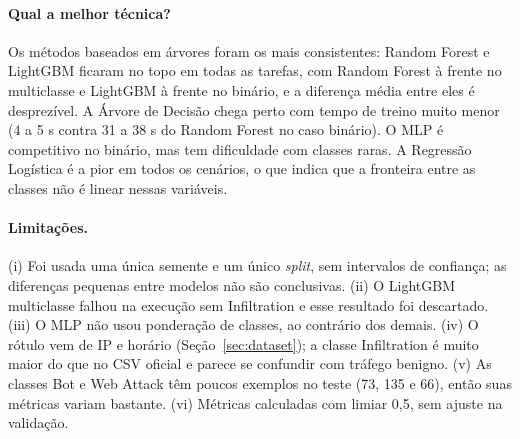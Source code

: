 \paragraph{Qual a melhor técnica?}
Os métodos baseados em árvores foram os mais consistentes: Random Forest e LightGBM ficaram no topo em todas as tarefas, com Random Forest à frente no multiclasse e LightGBM à frente no binário, e a diferença média entre eles é desprezível. A Árvore de Decisão chega perto com tempo de treino muito menor (4 a 5 s contra 31 a 38 s do Random Forest no caso binário). O MLP é competitivo no binário, mas tem dificuldade com classes raras. A Regressão Logística é a pior em todos os cenários, o que indica que a fronteira entre as classes não é linear nessas variáveis.

\paragraph{Limitações.}
(i) Foi usada uma única semente e um único \textit{split}, sem intervalos de confiança; as diferenças pequenas entre modelos não são conclusivas. (ii) O LightGBM multiclasse falhou na execução sem Infiltration e esse resultado foi descartado. (iii) O MLP não usou ponderação de classes, ao contrário dos demais. (iv) O rótulo vem de IP e horário (Seção~\ref{sec:dataset}); a classe Infiltration é muito maior do que no CSV oficial e parece se confundir com tráfego benigno. (v) As classes Bot e Web Attack têm poucos exemplos no teste (73, 135 e 66), então suas métricas variam bastante. (vi) Métricas calculadas com limiar 0,5, sem ajuste na validação.
